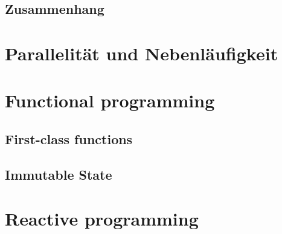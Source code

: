 


\pagebreak

\subsection{Zusammenhang}


%
%
%

\section{Parallelität und Nebenläufigkeit}





\section{Functional programming}

\subsection{First-class functions}
\subsection{Immutable State}

\section{Reactive programming}

